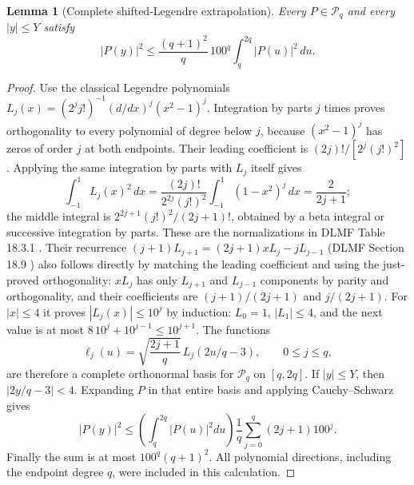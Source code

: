 \documentclass[11pt]{article}
\newtheorem{lemma}{Lemma}
\begin{document}
\begin{lemma}[Complete shifted-Legendre extrapolation]
Every $P\in\mathcal P_q$ and every $|y|\leq Y$ satisfy
\[
 |P(y)|^2\leq\frac{(q+1)^2}{q}\,100^q
                    \int_q^{2q}|P(u)|^2\,du.     \tag{RC8}
\]
\end{lemma}
\begin{proof}
Use the classical Legendre polynomials
$L_j(x)=(2^j j!)^{-1}(d/dx)^j(x^2-1)^j$.
Integration by parts $j$ times proves orthogonality to every polynomial
of degree below $j$, because $(x^2-1)^j$ has zeros of order $j$ at both
endpoints.
Their leading coefficient is $(2j)!/[2^j(j!)^2]$.
Applying the same integration by parts with $L_j$ itself gives
\[
 \int_{-1}^1L_j(x)^2\,dx
 =\frac{(2j)!}{2^{2j}(j!)^2}
                 \int_{-1}^1(1-x^2)^j\,dx
 =\frac2{2j+1};
\]
the middle integral is
$2^{2j+1}(j!)^2/(2j+1)!$, obtained by a beta integral or
successive integration by parts.
These are the normalizations in DLMF Table 18.3.1
\cite{DLMF183}.
Their recurrence
$(j+1)L_{j+1}=(2j+1)xL_j-jL_{j-1}$
(DLMF Section 18.9 \cite{DLMF189}) also follows directly by matching
the leading coefficient and using the just-proved orthogonality:
$xL_j$ has only $L_{j+1}$ and $L_{j-1}$ components by parity and
orthogonality, and their coefficients are
$(j+1)/(2j+1)$ and $j/(2j+1)$.
For $|x|\leq4$ it proves $|L_j(x)|\leq10^j$ by induction:
$L_0=1$, $|L_1|\leq4$, and the next value is at most
$8\,10^j+10^{j-1}\leq10^{j+1}$.
The functions
\[
 \ell_j(u)=\sqrt{\frac{2j+1}{q}}\,L_j(2u/q-3),
 \qquad 0\leq j\leq q,
\]
are therefore a complete orthonormal basis for $\mathcal P_q$ on
$[q,2q]$. If $|y|\leq Y$, then $|2y/q-3|<4$.
Expanding $P$ in that entire basis and applying Cauchy--Schwarz gives
\[
 |P(y)|^2\leq
 \left(\int_q^{2q}|P(u)|^2du\right)
 \frac1q\sum_{j=0}^q(2j+1)100^j.
\]
Finally the sum is at most $100^q(q+1)^2$.
All polynomial directions, including the endpoint degree $q$, were
included in this calculation.
\end{proof}
\end{document}
